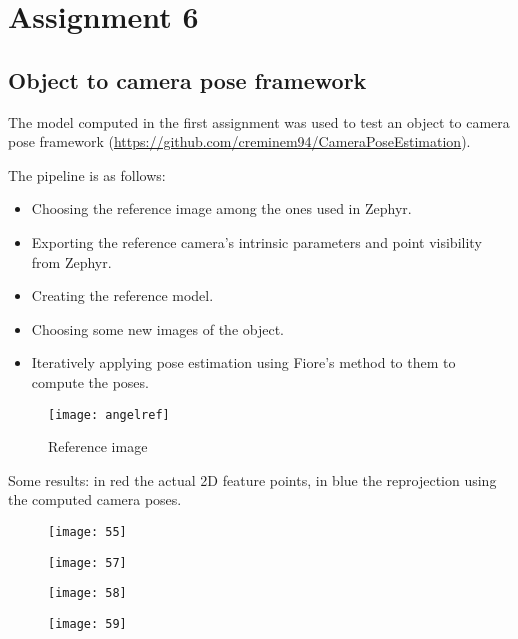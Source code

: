 \section{Assignment 6}

\subsection{Object to camera pose framework}

The model computed in the first assignment was used to test an object to camera pose framework (\url{https://github.com/creminem94/CameraPoseEstimation}).

The pipeline is as follows:
\begin{itemize}
\item Choosing the reference image among the ones used in Zephyr.
\item Exporting the reference camera's intrinsic parameters and point visibility from Zephyr.
\item Creating the reference model.
\item Choosing some new images of the object.
\item Iteratively applying pose estimation using Fiore's method to them to compute the poses.
\end{itemize}

\begin{figure}[h]
\centering
\texttt{[image: angelref]}
\caption{Reference image}
\end{figure}

\newpage

Some results: in red the actual 2D feature points, in blue the reprojection using the computed camera poses.

\begin{figure}[h]
\centering
\begin{minipage}{0.45\textwidth}
\texttt{[image: 55]}
\end{minipage}
\begin{minipage}{0.45\textwidth}
\texttt{[image: 57]}
\end{minipage}
\end{figure}

\begin{figure}[H]
\centering
\begin{minipage}{0.45\textwidth}
\texttt{[image: 58]}
\end{minipage}
\begin{minipage}{0.45\textwidth}
\texttt{[image: 59]}
\end{minipage}
\end{figure}

